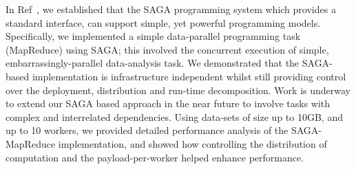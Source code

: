 \documentclass[conference,final]{IEEEtran}
\begin{document}

In Ref~\cite{saga_ccgrid09}, we established that the SAGA programming
system which provides a standard interface, %
can support simple, yet powerful programming models.  Specifically, we
implemented a simple data-parallel programming task (MapReduce) using
SAGA; this involved the concurrent execution of simple,
embarrassingly-parallel data-analysis task.  We demonstrated that the
SAGA-based implementation is infrastructure independent whilst still
providing control over the deployment, distribution and run-time
decomposition.  Work is underway to extend our SAGA based approach in
the near future to involve tasks with complex and interrelated
dependencies.  Using data-sets of size up to 10GB, and up to 10
workers, we provided detailed performance analysis of the
SAGA-MapReduce implementation, and showed how controlling the
distribution of computation and the payload-per-worker helped enhance
performance.



\end{document}
